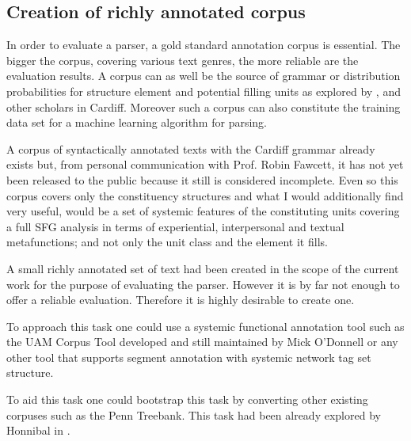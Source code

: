 \subsection{Creation of richly annotated corpus}
    In order to evaluate a parser, a gold standard annotation corpus is essential.  The bigger the corpus, covering various text genres, the more reliable are the evaluation results. A corpus can as well be the source of grammar or distribution probabilities for structure element and potential filling units as explored by \citet{Day2007}, \citet{Souter1996} and other scholars in Cardiff. Moreover such a corpus can also constitute the training data set for a machine learning algorithm for parsing.

    A corpus of syntactically annotated texts with the Cardiff grammar already exists but, from personal communication with Prof. Robin Fawcett, it has not yet been released to the public because it still is considered incomplete. Even so this corpus covers only the constituency structures and what I would additionally find very useful, would be a set of systemic features of the constituting units covering a full SFG analysis in terms of experiential, interpersonal and textual metafunctions; and not only the unit class and the element it fills.

    A small richly annotated set of text had been created in the scope of the current work for the purpose of evaluating the parser. However it is by far not enough to offer a reliable evaluation. Therefore it is highly desirable to create one. 

    To approach this task one could use a systemic functional annotation tool such as the UAM Corpus Tool \citep{ODonnell2008,ODonnell2008a} developed and still maintained by Mick O'Donnell or any other tool that supports segment annotation with systemic network tag set structure.

    To aid this task one could bootstrap this task by converting other existing corpuses such as the Penn Treebank. This task had been already explored by Honnibal in \citeyear{Honnibal2004a,Honnibal2007}.


